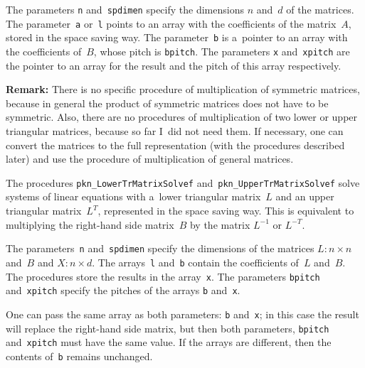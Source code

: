 The parameters \texttt{n} and~\texttt{spdimen} specify the dimensions
$n$ and~$d$ of the matrices.
The parameter~\texttt{a} or~\texttt{l} points to an array with the coefficients
of the matrix~$A$, stored in the space saving way. The parameter~\texttt{b} is
a~pointer to an array with the coefficients of~$B$, whose pitch
is \texttt{bpitch}.
The parameters \texttt{x} and~\texttt{xpitch} are the pointer to an array for
the result and the pitch of this array respectively.

\vspace{\medskipamount}
\noindent
\textbf{Remark:}
There is no specific procedure of multiplication of symmetric matrices,
because in general the product of symmetric matrices does not have to be
symmetric. Also, there are no procedures of multiplication of two lower or upper
triangular matrices, because so far I~did not need them. If necessary,
one can \mbox{convert} the matrices to the full representation (with the
procedures described later) and use the procedure of multiplication of
general matrices.

\vspace{\bigskipamount}
\begin{sloppypar}
The procedures \texttt{pkn\_LowerTrMatrixSolvef}
and~\texttt{pkn\_UpperTrMatrixSolvef}
\mbox{solve} systems of linear equations with a~lower triangular matrix~$L$
and an upper triangular matrix~$L^T$, represented in the space saving way.
This is equivalent to multiplying the right-hand side matrix~$B$ by the
matrix $L^{-1}$ or $L^{-T}$.%
\end{sloppypar}

The parameters~\texttt{n} and~\texttt{spdimen} specify the dimensions of
the matrices $L\colon n\times n$ and~$B$ and $X\colon n\times d$.
The arrays~\texttt{l} and~\texttt{b} contain the coefficients of~$L$ and~$B$.
The procedures store the results in the array~\texttt{x}. The parameters
\texttt{bpitch} and~\texttt{xpitch} specify the pitches of the arrays
\texttt{b} and~\texttt{x}.

One can pass the same array as both parameters: \texttt{b} and~\texttt{x};
in this case the result will replace the right-hand side matrix, but then
both parameters, \texttt{bpitch} and~\texttt{xpitch} must have the same value.
If the arrays are different, then the contents of~\texttt{b}
remains unchanged.

